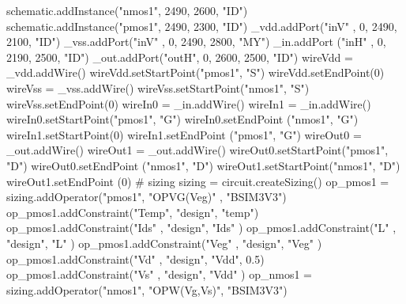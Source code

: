 \begin{DoxyCodeInclude}
schematic.addInstance(\textcolor{stringliteral}{"nmos1"}, 2490, 2600, \textcolor{stringliteral}{"ID"})
schematic.addInstance(\textcolor{stringliteral}{"pmos1"}, 2490, 2300, \textcolor{stringliteral}{"ID"})
\_vdd.addPort(\textcolor{stringliteral}{"inV"} , 0, 2490, 2100, \textcolor{stringliteral}{"ID"})
\_vss.addPort(\textcolor{stringliteral}{"inV"} , 0, 2490, 2800, \textcolor{stringliteral}{"MY"})
\_in.addPort (\textcolor{stringliteral}{"inH"} , 0, 2190, 2500, \textcolor{stringliteral}{"ID"})
\_out.addPort(\textcolor{stringliteral}{"outH"}, 0, 2600, 2500, \textcolor{stringliteral}{"ID"})
wireVdd = \_vdd.addWire()
wireVdd.setStartPoint(\textcolor{stringliteral}{"pmos1"}, \textcolor{stringliteral}{"S"})
wireVdd.setEndPoint(0)
wireVss = \_vss.addWire()
wireVss.setStartPoint(\textcolor{stringliteral}{"nmos1"}, \textcolor{stringliteral}{"S"})
wireVss.setEndPoint(0)
wireIn0 = \_in.addWire()
wireIn1 = \_in.addWire()
wireIn0.setStartPoint(\textcolor{stringliteral}{"pmos1"}, \textcolor{stringliteral}{"G"})
wireIn0.setEndPoint  (\textcolor{stringliteral}{"nmos1"}, \textcolor{stringliteral}{"G"})
wireIn1.setStartPoint(0)
wireIn1.setEndPoint  (\textcolor{stringliteral}{"pmos1"}, \textcolor{stringliteral}{"G"})
wireOut0 = \_out.addWire()
wireOut1 = \_out.addWire()
wireOut0.setStartPoint(\textcolor{stringliteral}{"pmos1"}, \textcolor{stringliteral}{"D"})
wireOut0.setEndPoint  (\textcolor{stringliteral}{"nmos1"}, \textcolor{stringliteral}{"D"})
wireOut1.setStartPoint(\textcolor{stringliteral}{"nmos1"}, \textcolor{stringliteral}{"D"})
wireOut1.setEndPoint  (0)
\textcolor{comment}{# sizing}
sizing = circuit.createSizing()
op\_pmos1 = sizing.addOperator(\textcolor{stringliteral}{"pmos1"}, \textcolor{stringliteral}{"OPVG(Veg)"} , \textcolor{stringliteral}{"BSIM3V3"})
op\_pmos1.addConstraint(\textcolor{stringliteral}{"Temp"}, \textcolor{stringliteral}{"design"}, \textcolor{stringliteral}{"temp"})
op\_pmos1.addConstraint(\textcolor{stringliteral}{"Ids"} , \textcolor{stringliteral}{"design"}, \textcolor{stringliteral}{"Ids"} )
op\_pmos1.addConstraint(\textcolor{stringliteral}{"L"}   , \textcolor{stringliteral}{"design"}, \textcolor{stringliteral}{"L"}   )
op\_pmos1.addConstraint(\textcolor{stringliteral}{"Veg"} , \textcolor{stringliteral}{"design"}, \textcolor{stringliteral}{"Veg"} )
op\_pmos1.addConstraint(\textcolor{stringliteral}{"Vd"}  , \textcolor{stringliteral}{"design"}, \textcolor{stringliteral}{"Vdd"}, 0.5)
op\_pmos1.addConstraint(\textcolor{stringliteral}{"Vs"}  , \textcolor{stringliteral}{"design"}, \textcolor{stringliteral}{"Vdd"} )
op\_nmos1 = sizing.addOperator(\textcolor{stringliteral}{"nmos1"}, \textcolor{stringliteral}{"OPW(Vg,Vs)"}, \textcolor{stringliteral}{"BSIM3V3"})

\end{DoxyCodeInclude}
